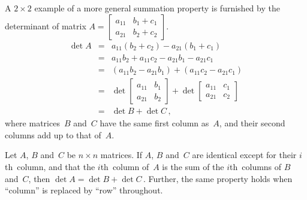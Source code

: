 \begin{example} \label{eg:cpdet2}
A \(2\times2\) example of a more general summation property is furnished by the determinant of matrix \(A=\begin{bmatrix} a_{11}&b_1+c_1\\a_{21}&b_2+c_2 \end{bmatrix}\).
\begin{eqnarray*}
\det A&=&a_{11}(b_2+c_2)-a_{21}(b_1+c_1)
\\&=&a_{11}b_2+a_{11}c_2-a_{21}b_1-a_{21}c_1
\\&=&(a_{11}b_2-a_{21}b_1)+(a_{11}c_2-a_{21}c_1)
\\&=&\det\begin{bmatrix} a_{11}&b_1\\a_{21}&b_2 \end{bmatrix}
+\det\begin{bmatrix} a_{11}&c_1\\a_{21}&c_2 \end{bmatrix}
\\&=&\det B+\det C\,,
\end{eqnarray*}
where matrices~\(B\) and~\(C\) have the same first column as~\(A\), and their second columns add up to that of~\(A\).
\end{example}





\begin{theorem} \label{thm:rpdet:v} 
Let \(A\), \(B\) and~\(C\) be \(n\times n\) matrices.
If \(A\), \(B\) and~\(C\) are identical except for their \(i\)th~column, and that the \(i\)th~column of~\(A\) is the sum of the \(i\)th~columns of \(B\) and~\(C\), then \(\det A=\det B+\det C\)\,.
Further, the same property holds when ``column'' is replaced by ``row'' throughout.
\end{theorem}


